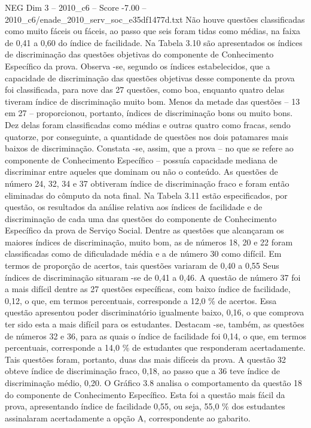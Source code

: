 \begin{textsample}{NEG Dim 3 – 2010\_c6 – Score -7.00 – 2010\_c6/enade\_2010\_serv\_soc\_e35df1477d.txt}
Não houve questões classificadas como muito fáceis ou fáceis, ao passo que seis foram tidas como médias, na faixa de 0,41 a 0,60 do índice de facilidade.
Na Tabela 3.10 são apresentados os índices de discriminação das questões objetivas do componente de Conhecimento Específico da prova.
Observa -se, segundo os índices estabelecidos, que a capacidade de discriminação das questões objetivas desse componente da prova foi classificada, para nove das 27 questões, como boa, enquanto quatro delas tiveram índice de discriminação muito bom.
Menos da metade das questões – 13 em 27 – proporcionou, portanto, índices de discriminação bons ou muito bons.
Dez delas foram classificadas como médias e outras quatro como fracas, sendo quatorze, por conseguinte, a quantidade de questões nos dois patamares mais baixos de discriminação.
Constata -se, assim, que a prova – no que se refere ao componente de Conhecimento Específico – possuía capacidade mediana de discriminar entre aqueles que dominam ou não o conteúdo.
As questões de número 24, 32, 34 e 37 obtiveram índice de discriminação fraco e foram então eliminadas do cômputo da nota final.
Na Tabela 3.11 estão especificados, por questão, os resultados da análise relativa aos índices de facilidade e de discriminação de cada uma das questões do componente de Conhecimento Específico da prova de Serviço Social.
Dentre as questões que alcançaram os maiores índices de discriminação, muito bom, as de números 18, 20 e 22 foram classificadas como de dificuladade média e a de número 30 como difícil.
Em termos de proporção de acertos, tais questões variaram de 0,40 a 0,55 Seus índices de discriminação situaram -se de 0,41 a 0,46.
A questão de número 37 foi a mais difícil dentre as 27 questões específicas, com baixo índice de facilidade, 0,12, o que, em termos percentuais, corresponde a 12,0 \% de acertos.
Essa questão apresentou poder discriminatório igualmente baixo, 0,16, o que comprova ter sido esta a mais difícil para os estudantes.
Destacam -se, também, as questões de números 32 e 36, para as quais o índice de facilidade foi 0,14, o que, em termos percentuais, corresponde a 14,0 \% de estudantes que responderam acertadamente.
Tais questões foram, portanto, duas das mais difíceis da prova.
A questão 32 obteve índice de discriminação fraco, 0,18, ao passo que a 36 teve índice de discriminação médio, 0,20.
O Gráfico 3.8 analisa o comportamento da questão 18 do componente de Conhecimento Específico.
Esta foi a questão mais fácil da prova, apresentando índice de facilidade 0,55, ou seja, 55,0 \% dos estudantes assinalaram acertadamente a opção A, correspondente ao gabarito.

\end{textsample}
